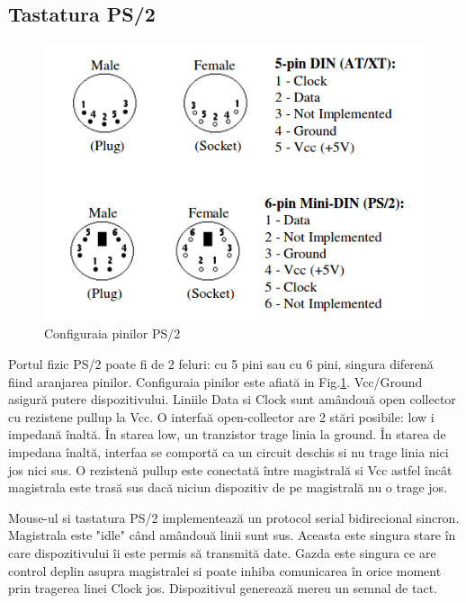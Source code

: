 \documentclass[a4paper,11pt,romanian]{article}
\begin{document}
{\subsection{Tastatura PS/2}

\begin{figure}
  \begin{center}
   \includegraphics[scale=0.5]{ps2pinout.png}
   \caption{Configuraia pinilor PS/2}
   \label{fig:ps2pinout}
  \end{center}
 \end{figure}
\small{Portul fizic PS/2 poate fi de 2 feluri: cu 5 pini sau cu 6 pini, singura diferen\u{a} fiind aranjarea pinilor. Configuraia pinilor este afiat\u{a} in Fig.\ref{fig:ps2pinout}.
Vcc/Ground asigur\u{a} putere dispozitivului. Liniile Data si Clock sunt am\^{a}ndou\u{a} open collector cu rezistene pullup la Vcc. O interfa\u{a} open-collector are 2 st\u{a}ri posibile: low i impedan\u{a} \^{i}nalt\u{a}. \^{I}n starea low, un tranzistor trage linia la ground. \^{I}n starea de impedana \^{i}nalt\u{a}, interfaa se comport\u{a} ca un circuit deschis si nu trage linia nici jos nici sus. O rezisten\u{a}  pullup este conectat\u{a} \^{i}ntre magistral\u{a} si Vcc astfel \^{i}nc\^{a}t magistrala este tras\u{a} sus dac\u{a} niciun dispozitiv de pe magistral\u{a} nu o trage jos.

Mouse-ul si tastatura PS/2 implementeaz\u{a} un protocol serial bidirecional sincron. Magistrala este "idle" c\^{a}nd am\^{a}ndou\u{a} linii sunt sus. Aceasta este singura stare \^{i}n care dispozitivului \^{i}i este permis s\u{a} transmit\u{a} date. Gazda este singura ce are control deplin asupra magistralei si poate inhiba comunicarea \^{i}n orice moment prin tragerea linei Clock jos. Dispozitivul genereaz\u{a} mereu un semnal de tact.

}}
\end{document}
